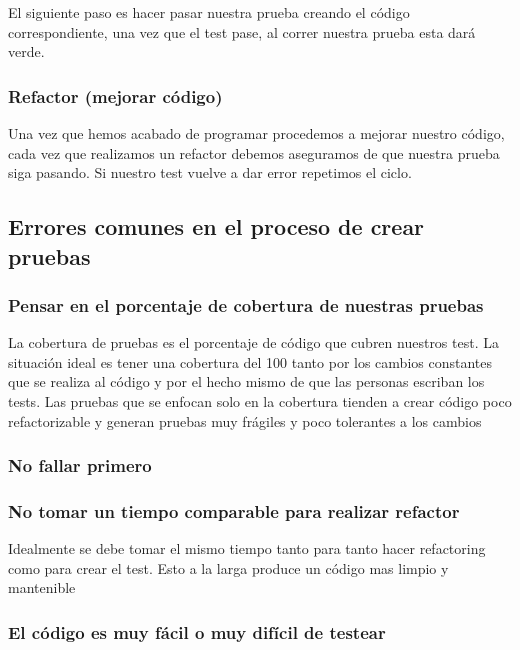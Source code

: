 El siguiente paso es hacer pasar nuestra prueba creando el código
correspondiente, una vez que el test pase, al correr nuestra prueba esta dará
verde.

\subsubsection{Refactor (mejorar código)}

Una vez que hemos acabado de programar procedemos a mejorar nuestro código,
cada vez que realizamos un refactor debemos aseguramos de que nuestra prueba
siga pasando. Si nuestro test vuelve a dar error repetimos el ciclo.

\subsection{Errores comunes en el proceso de crear pruebas}

\subsubsection{Pensar en el porcentaje de cobertura de nuestras pruebas}
La cobertura de pruebas es el porcentaje de código que cubren nuestros test. La
situación ideal es tener una cobertura del 100%
tanto por los cambios constantes que se realiza al código y por el hecho mismo
de que las personas escriban los tests. Las pruebas que se enfocan solo en la
cobertura tienden a crear código poco refactorizable y generan pruebas muy
frágiles y poco tolerantes a los cambios

\subsubsection{No fallar primero}

\subsubsection{No tomar un tiempo comparable para realizar refactor}
Idealmente se debe tomar el mismo tiempo tanto para tanto hacer refactoring
como para crear el test. Esto a la larga produce un código mas limpio y
mantenible

\subsubsection{El código es muy fácil o muy difícil de testear}

